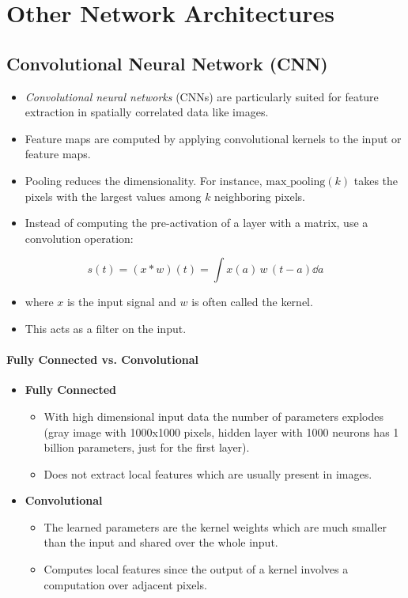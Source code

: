 	\section{Other Network Architectures}

		\subsection{Convolutional Neural Network (CNN)}
			\begin{itemize}
				\item \emph{Convolutional neural networks} (CNNs) are particularly suited for feature extraction in spatially correlated data like images.
				\item Feature maps are computed by applying convolutional kernels to the input or feature maps.
				\item Pooling reduces the dimensionality. For instance, \( \textrm{max\_pooling}(k) \) takes the pixels with the largest values among \(k\) neighboring pixels.
				\item Instead of computing the pre-activation of a layer with a matrix, use a convolution operation:
			\end{itemize}
			\begin{equation}
				s(t) = (x \ast w)(t) = \int x(a) \, w \, (t - a) \dd{a}
			\end{equation}
			\begin{itemize}
				\item[] where \(x\) is the input signal and \(w\) is often called the kernel.
				\item This acts as a filter on the input.
			\end{itemize}

			\paragraph{Fully Connected vs. Convolutional}
				\begin{itemize}
					\item \textbf{Fully Connected}
						\begin{itemize}
							\item With high dimensional input data the number of parameters explodes (gray image with 1000x1000 pixels, hidden layer with 1000 neurons has 1 billion parameters, just for the first layer).
							\item Does not extract local features which are usually present in images.
						\end{itemize}
					\item \textbf{Convolutional}
						\begin{itemize}
							\item The learned parameters are the kernel weights which are much smaller than the input and shared over the whole input.
							\item Computes local features since the output of a kernel involves a computation over adjacent pixels.
						\end{itemize}
				\end{itemize}

